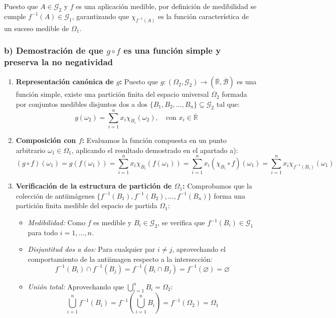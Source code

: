 \begin{problema}
Puesto que $A \in \mathcal{G}_2$ y $f$ es una aplicación medible, por definición de medibilidad se cumple $f^{-1}(A) \in \mathcal{G}_1$, garantizando que $\chi_{f^{-1}(A)}$ es la función característica de un suceso medible de $\Omega_1$.

\subsubsection*{b) Demostración de que $g \circ f$ es una función simple y preserva la no negatividad}
\begin{enumerate}[label=\arabic*.]
    \item \textbf{Representación canónica de $g$:}
    Puesto que $g : (\Omega_2, \mathcal{G}_2) \to (\overline{\mathbb{R}}, \overline{\mathcal{B}})$ es una función simple, existe una partición finita del espacio universal $\Omega_2$ formada por conjuntos medibles disjuntos dos a dos $\{B_1, B_2, \dots, B_n\} \subseteq \mathcal{G}_2$ tal que:
    \[
        g(\omega_2) = \sum_{i=1}^n x_i \chi_{B_i}(\omega_2), \quad \text{con } x_i \in \overline{\mathbb{R}}
    \]

    \item \textbf{Composición con $f$:}
    Evaluamos la función compuesta en un punto arbitrario $\omega_1 \in \Omega_1$, aplicando el resultado demostrado en el apartado a):
    \[
        (g \circ f)(\omega_1) = g(f(\omega_1)) = \sum_{i=1}^n x_i \chi_{B_i}(f(\omega_1)) = \sum_{i=1}^n x_i (\chi_{B_i} \circ f)(\omega_1) = \sum_{i=1}^n x_i \chi_{f^{-1}(B_i)}(\omega_1)
    \]

    \item \textbf{Verificación de la estructura de partición de $\Omega_1$:}
    Comprobamos que la colección de antiimágenes $\{f^{-1}(B_1), f^{-1}(B_2), \dots, f^{-1}(B_n)\}$ forma una partición finita medible del espacio de partida $\Omega_1$:
    \begin{itemize}
        \item \textit{Medibilidad:} Como $f$ es medible y $B_i \in \mathcal{G}_2$, se verifica que $f^{-1}(B_i) \in \mathcal{G}_1$ para todo $i = 1, \dots, n$.
        \item \textit{Disjuntitud dos a dos:} Para cualquier par $i \neq j$, aprovechando el comportamiento de la antiimagen respecto a la intersección:
        \[
            f^{-1}(B_i) \cap f^{-1}(B_j) = f^{-1}(B_i \cap B_j) = f^{-1}(\varnothing) = \varnothing
        \]
        \item \textit{Unión total:} Aprovechando que $\bigcup_{i=1}^n B_i = \Omega_2$:
        \[
            \bigcup_{i=1}^n f^{-1}(B_i) = f^{-1}\left( \bigcup_{i=1}^n B_i \right) = f^{-1}(\Omega_2) = \Omega_1
        \]
    \end{itemize}
\end{enumerate}


\end{problema}
